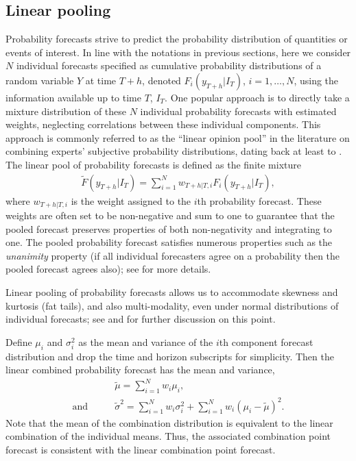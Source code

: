 \documentclass[a4paper,11pt]{article}
\begin{document}
\subsection{Linear pooling}
\label{sec:linear_pooling}

Probability forecasts strive to predict the probability distribution of quantities or events of interest. In line with the notations in previous sections, here we consider $N$ individual forecasts specified as cumulative probability distributions of a random variable $Y$ at time $T+h$, denoted $F_{i}(y_{T+h}|I_{T})$, $i=1,\dots,N$, using the information available up to time $T$, $I_{T}$. One popular approach is to directly take a mixture distribution of these $N$ individual probability forecasts with estimated weights, neglecting correlations between these individual components. This approach is commonly referred to as the ``linear opinion pool'' in the literature on combining experts' subjective probability distributions, dating back at least to \citet{Stone1961-zd}. The linear pool of probability forecasts is defined as the finite mixture
\begin{align}
  \label{eq:linear_pool}
  \tilde{F}(y_{T+h}|I_{T}) = \sum_{i=1}^{N} w_{T+h|T,i} F_{i}(y_{T+h}|I_{T}),
\end{align}
where $w_{T+h|T,i}$ is the weight assigned to the $i$th probability forecast. These weights are often set to be non-negative and sum to one to guarantee that the pooled forecast preserves properties of both non-negativity and integrating to one. The pooled probability forecast satisfies numerous properties such as the \textit{unanimity} property (if all individual forecasters agree on a probability then the pooled forecast agrees also); see \citet{Clemen1999-mh} for more details.

Linear pooling of probability forecasts allows us to accommodate skewness and kurtosis (fat tails), and also multi-modality, even under normal distributions of individual forecasts; see \citet{Wallis2005-yf} and \citet{Hall2007-lh} for further discussion on this point.

Define $\mu_{i}$ and $\sigma_{i}^{2}$ as the mean and variance of the $i$th component forecast distribution and drop the time and horizon subscripts for simplicity. Then the linear combined probability forecast has the mean and variance,
\begin{align}
   & \tilde{\mu} = \sum_{i=1}^{N} w_{i} \mu_{i}, \label{eq:mean_linear_pooling}  \\
  \text{and}\qquad
   & \tilde{\sigma}^{2} = \sum_{i=1}^{N} w_{i} \sigma_{i}^{2} + \sum_{i=1}^{N} w_{i} \left(\mu_{i}-\tilde{\mu}\right)^{2}. \label{eq:variance_linear_pooling}
\end{align}
Note that the mean of the combination distribution is equivalent to the linear combination of the individual means. Thus, the associated combination point forecast is consistent with the linear combination point forecast.
\end{document}
